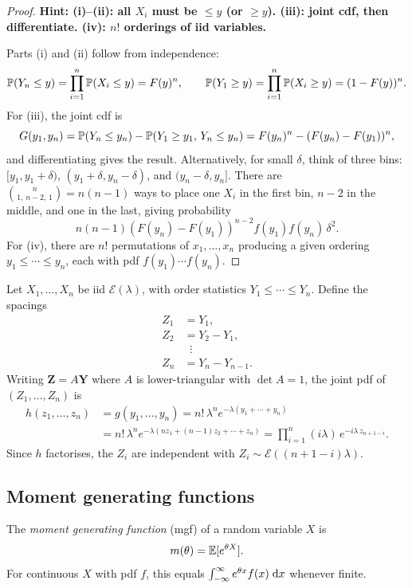 \documentclass[a4paper]{article}
\begin{document}
\begin{proof}
  \textbf{Hint: (i)--(ii): all $X_i$ must be $\leq y$ (or $\geq y$). (iii): joint cdf, then differentiate. (iv): $n!$ orderings of iid variables.}

  Parts (i) and (ii) follow from independence:
  \[
    \P(Y_n \leq y) = \prod_{i=1}^n \P(X_i \leq y) = F(y)^n, \qquad \P(Y_1 \geq y) = \prod_{i=1}^n \P(X_i \geq y) = (1 - F(y))^n.
  \]
  For (iii), the joint cdf is
  \[
    G(y_1, y_n) = \P(Y_n \leq y_n) - \P(Y_1 \geq y_1,\, Y_n \leq y_n) = F(y_n)^n - (F(y_n) - F(y_1))^n,
  \]
  and differentiating gives the result.
  Alternatively, for small $\delta$, think of three bins: $[y_1, y_1 + \delta)$, $(y_1 + \delta, y_n - \delta)$, and $(y_n - \delta, y_n]$.
  There are $\binom{n}{1,\, n-2,\, 1} = n(n-1)$ ways to place one $X_i$ in the first bin, $n - 2$ in the middle, and one in the last, giving probability
  \[
    n(n-1)(F(y_n) - F(y_1))^{n-2} f(y_1) f(y_n)\,\delta^2.
  \]
  For (iv), there are $n!$ permutations of $x_1, \dotsc, x_n$ producing a given ordering $y_1 \leq \dotsb \leq y_n$, each with pdf $f(y_1) \dotsm f(y_n)$.
\end{proof}

\begin{eg}
  Let $X_1, \dotsc, X_n$ be iid $\mathcal{E}(\lambda)$, with order statistics $Y_1 \leq \dotsb \leq Y_n$.
  Define the spacings
  \begin{align*}
    Z_1 &= Y_1,\\
    Z_2 &= Y_2 - Y_1,\\
    &\;\;\vdots\\
    Z_n &= Y_n - Y_{n-1}.
  \end{align*}
  Writing $\mathbf{Z} = A\mathbf{Y}$ where $A$ is lower-triangular with $\det A = 1$, the joint pdf of $(Z_1, \dotsc, Z_n)$ is
  \begin{align*}
    h(z_1, \dotsc, z_n) &= g(y_1, \dotsc, y_n) = n!\,\lambda^n e^{-\lambda(y_1 + \dotsb + y_n)}\\
    &= n!\,\lambda^n e^{-\lambda(nz_1 + (n-1)z_2 + \dotsb + z_n)} = \prod_{i=1}^n (i\lambda)\, e^{-i\lambda\, z_{n+1-i}}.
  \end{align*}
  Since $h$ factorises, the $Z_i$ are independent with $Z_i \sim \mathcal{E}((n+1-i)\lambda)$.
\end{eg}


\subsection{Moment generating functions}
\begin{defi}
  The \emph{moment generating function} (mgf) of a random variable $X$ is
  \[
    m(\theta) = \E[e^{\theta X}].
  \]
  For continuous $X$ with pdf $f$, this equals $\int_{-\infty}^\infty e^{\theta x} f(x)\;\d x$ whenever finite.
\end{defi}
\end{document}
